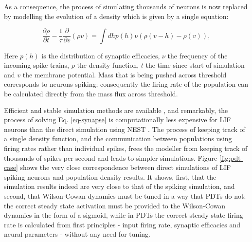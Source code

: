 \documentclass[10pt]{article}
\begin{document}
As a consequence, the process of simulating thousands of neurons is now replaced by modelling the evolution of a density which is given by a single equation:

\begin{equation}
\frac{\partial \rho}{\partial t} -\frac{1}{\tau}\frac{\partial}{\partial v}(\rho v) = \int dh p(h) \nu (\rho(v - h) -\rho(v)),
\label{eq-synapse}
\end{equation} 

Here $p(h)$ is the distribution of synaptic efficacies, $\nu$ the frequency of the incoming spike trains, $\rho$ the density function, $t$ the time since start of simulation and $v$ the membrane potential.
Mass that is being pushed across threshold corresponds to neurons spiking; consequently  the firing rate of the population can be calculated directly from the mass flux across threshold.

Efficient and stable simulation methods are available \cite{nykamp2000population, de2003simple, de2013generic, iyer2013influence}, and remarkably, the process of solving Eq. \ref{eq-synapse} is computationally less expensive for LIF neurons than the direct simulation using NEST \cite{nykamp2000population}.
The process of keeping track of a single density function, and the communication between populations using firing rates rather than individual spikes, frees the modeller from keeping track of thousands of spikes per second and leads to simpler simulations.
Figure \ref{fig:pdt-case} shows the very close correspondence between direct simulations of LIF spiking neurons and population density results.
It shows, first, that the simulation results indeed are very close to that of the spiking simulation, and second, that Wilson-Cowan dynamics must be tuned in a way that PDTs do not: the correct steady state activation must be provided to the Wilson-Cowan dynamics in the form of a sigmoid, while in PDTs the correct steady state firing rate is calculated from first principles - input firing rate, synaptic efficacies and neural parameters - without any need for tuning. 
\end{document}
